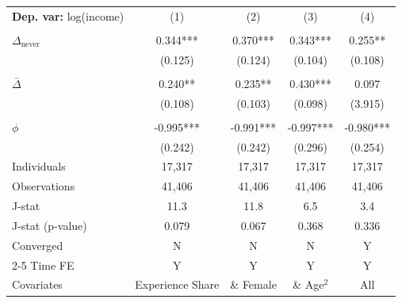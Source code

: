 \begin{tabular}{l cccc} \toprule  \textbf{Dep. var:}  log(income) 
                    &\multicolumn{1}{c}{(1)}   &\multicolumn{1}{c}{(2)}   &\multicolumn{1}{c}{(3)}   &\multicolumn{1}{c}{(4)}   \\
                    &               &               &               &               \\
\addlinespace
$\Delta_{\text{never}}$&       0.344***&       0.370***&       0.343***&       0.255** \\
                    &     (0.125)   &     (0.124)   &     (0.104)   &     (0.108)   \\
                    &               &               &               &               \\
\addlinespace
$\bar{\Delta}$      &       0.240** &       0.235** &       0.430***&       0.097   \\
                    &     (0.108)   &     (0.103)   &     (0.098)   &     (3.915)   \\
                    &               &               &               &               \\
\addlinespace
$\phi$              &      -0.995***&      -0.991***&      -0.997***&      -0.980***\\
                    &     (0.242)   &     (0.242)   &     (0.296)   &     (0.254)   \\
\addlinespace
Individuals         &      17,317   &      17,317   &      17,317   &      17,317   \\
Observations        &      41,406   &      41,406   &      41,406   &      41,406   \\
J-stat              &        11.3   &        11.8   &         6.5   &         3.4   \\
J-stat (p-value)    &       0.079   &       0.067   &       0.368   &       0.336   \\
Converged           &           N   &           N   &           N   &           Y   \\
\cmidrule{2-5} Time FE & Y & Y & Y & Y \\ Covariates & Experience Share & \& Female & \& Age$^2$ & All \\ \bottomrule \end{tabular}

